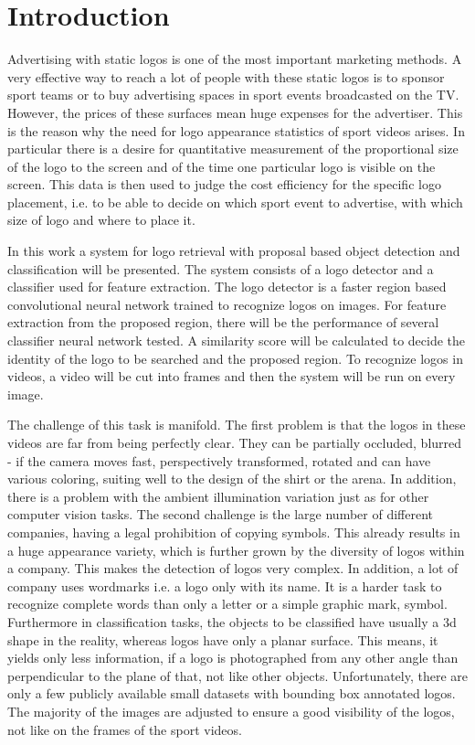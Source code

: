 \chapter{Introduction}\label{c:intro}

Advertising with static logos is one of the most important marketing methods. A very effective way to reach a lot of people with these static logos is to sponsor sport teams or to buy advertising spaces in sport events broadcasted on the TV. However, the prices of these surfaces mean huge expenses for the advertiser. This is the reason why the need for logo appearance statistics of sport videos arises. In particular there is a desire for quantitative measurement of the proportional size of the logo to the screen and of the time one particular logo is visible on the screen. This data is then used to judge the cost efficiency for the specific logo placement, i.e. to be able to decide on which sport event to advertise, with which size of logo and where to place it.

In this work a system for logo retrieval with proposal based object detection and classification will be presented. The system consists of a logo detector and a classifier used for feature extraction. The logo detector is a faster region based convolutional neural network \cite{NIPS2015_5638} trained to recognize logos on images. For feature extraction from the proposed region, there will be the performance of several classifier neural network tested. A similarity score will be calculated to decide the identity of the logo to be searched and the proposed region. To recognize logos in videos, a video will be cut into frames and then the system will be run on every image.

The challenge of this task is manifold. The first problem is that the logos in these videos are far from being perfectly clear. They can be partially occluded, blurred - if the camera moves fast, perspectively transformed, rotated and can have various coloring, suiting well to the design of the shirt or the arena. In addition, there is a problem with the ambient illumination variation just as for other computer vision tasks.
The second challenge is the large number of different companies, having a legal prohibition of copying symbols. This already results in a huge appearance variety, which is further grown by the diversity of logos within a company. This makes the detection of logos very complex. In addition, a lot of company uses wordmarks i.e. a logo only with its name. It is a harder task to recognize complete words than only a letter or a simple graphic mark, symbol.
Furthermore in classification tasks, the objects to be classified have usually a 3d shape in the reality, whereas logos have only a planar surface. This means, it yields only less information, if a logo is photographed from any other angle than perpendicular to the plane of that, not like other objects.
Unfortunately, there are only a few publicly available small datasets with bounding box annotated logos. The majority of the images are adjusted to ensure a good visibility of the logos, not like on the frames of the sport videos.

